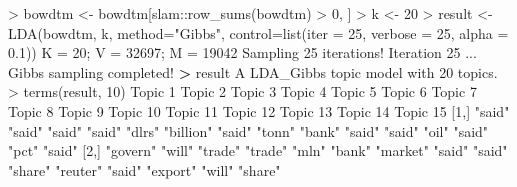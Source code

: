 \documentclass[
]{article}
\newenvironment{Shaded}{}{}
\newcommand{\AttributeTok}[1]{\textcolor[rgb]{0.49,0.56,0.16}{#1}}
\newcommand{\DecValTok}[1]{\textcolor[rgb]{0.25,0.63,0.44}{#1}}
\newcommand{\ErrorTok}[1]{\textcolor[rgb]{1.00,0.00,0.00}{\textbf{#1}}}
\newcommand{\FloatTok}[1]{\textcolor[rgb]{0.25,0.63,0.44}{#1}}
\newcommand{\FunctionTok}[1]{\textcolor[rgb]{0.02,0.16,0.49}{#1}}
\newcommand{\NormalTok}[1]{#1}
\newcommand{\OtherTok}[1]{\textcolor[rgb]{0.00,0.44,0.13}{#1}}
\newcommand{\SpecialCharTok}[1]{\textcolor[rgb]{0.25,0.44,0.63}{#1}}
\newcommand{\StringTok}[1]{\textcolor[rgb]{0.25,0.44,0.63}{#1}}
\begin{document}
\begin{Shaded}
\begin{Highlighting}[]
\SpecialCharTok{\textgreater{}}\NormalTok{ bowdtm }\OtherTok{\textless{}{-}}\NormalTok{ bowdtm[slam}\SpecialCharTok{::}\FunctionTok{row\_sums}\NormalTok{(bowdtm) }\SpecialCharTok{\textgreater{}} \DecValTok{0}\NormalTok{, ]}
\SpecialCharTok{\textgreater{}}\NormalTok{ k }\OtherTok{\textless{}{-}} \DecValTok{20}
\SpecialCharTok{\textgreater{}}\NormalTok{ result }\OtherTok{\textless{}{-}} \FunctionTok{LDA}\NormalTok{(bowdtm, k, }\AttributeTok{method=}\StringTok{"Gibbs"}\NormalTok{, }\AttributeTok{control=}\FunctionTok{list}\NormalTok{(}\AttributeTok{iter =} \DecValTok{25}\NormalTok{, }\AttributeTok{verbose =} \DecValTok{25}\NormalTok{, }\AttributeTok{alpha =} \FloatTok{0.1}\NormalTok{))}
\NormalTok{K }\OtherTok{=} \DecValTok{20}\NormalTok{; V }\OtherTok{=} \DecValTok{32697}\NormalTok{; M }\OtherTok{=} \DecValTok{19042}
\NormalTok{Sampling }\DecValTok{25}\NormalTok{ iterations}\SpecialCharTok{!}
\NormalTok{Iteration }\DecValTok{25}\NormalTok{ ...}
\NormalTok{Gibbs sampling completed}\SpecialCharTok{!}
\ErrorTok{\textgreater{}}\NormalTok{ result}
\NormalTok{A LDA\_Gibbs topic model with }\DecValTok{20}\NormalTok{ topics.}
\SpecialCharTok{\textgreater{}} \FunctionTok{terms}\NormalTok{(result, }\DecValTok{10}\NormalTok{)}
\NormalTok{      Topic }\DecValTok{1}\NormalTok{   Topic }\DecValTok{2}\NormalTok{   Topic }\DecValTok{3}\NormalTok{   Topic }\DecValTok{4}\NormalTok{    Topic }\DecValTok{5}\NormalTok{   Topic }\DecValTok{6}\NormalTok{   Topic }\DecValTok{7}\NormalTok{   Topic }\DecValTok{8}\NormalTok{      Topic }\DecValTok{9}\NormalTok{    Topic }\DecValTok{10}\NormalTok{  Topic }\DecValTok{11}\NormalTok{  Topic }\DecValTok{12}\NormalTok{  Topic }\DecValTok{13}\NormalTok{  Topic }\DecValTok{14}\NormalTok{ Topic }\DecValTok{15} 
\NormalTok{ [}\DecValTok{1}\NormalTok{,] }\StringTok{"said"}    \StringTok{"said"}    \StringTok{"said"}    \StringTok{"said"}     \StringTok{"dlrs"}    \StringTok{"billion"} \StringTok{"said"}    \StringTok{"tonn"}       \StringTok{"bank"}     \StringTok{"said"}    \StringTok{"said"}    \StringTok{"oil"}     \StringTok{"said"}    \StringTok{"pct"}    \StringTok{"said"}   
\NormalTok{ [}\DecValTok{2}\NormalTok{,] }\StringTok{"govern"}  \StringTok{"will"}    \StringTok{"trade"}   \StringTok{"trade"}    \StringTok{"mln"}     \StringTok{"bank"}    \StringTok{"market"}  \StringTok{"said"}       \StringTok{"said"}     \StringTok{"share"}   \StringTok{"reuter"}  \StringTok{"said"}    \StringTok{"export"}  \StringTok{"will"}   \StringTok{"share"}  

\end{Highlighting}
\end{Shaded}
\end{document}
